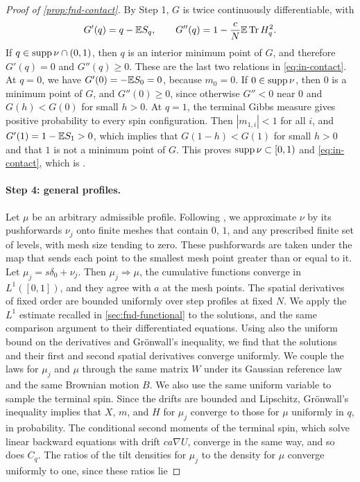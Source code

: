 \begin{proof}[Proof of \cref{prop:fnd-contact}]
By Step 1, $G$ is twice continuously differentiable, with
\[
 G'(q)=q-\mathbb E S_q,\qquad G''(q)=1-\frac cN\mathbb E\operatorname{Tr} H_q^2 .
\]
If $q\in\operatorname{supp}\nu\cap(0,1)$, then $q$ is an interior minimum point of
$G$, and therefore $G'(q)=0$ and $G''(q)\ge0$. These are the last two
relations in
\eqref{eq:in-contact}. At $q=0$, we have $G'(0)=-\mathbb E S_0=0$, because
$m_0=0$. If $0\in\operatorname{supp}\nu$, then $0$ is a minimum point of $G$, and
$G''(0)\ge0$, since otherwise $G''<0$ near $0$ and $G(h)<G(0)$ for
small $h>0$. At $q=1$, the terminal Gibbs measure gives positive
probability to every spin configuration. Then $|m_{1,i}|<1$ for all $i$,
and $G'(1)=1-\mathbb E S_1>0$, which implies that $G(1-h)<G(1)$ for small $h>0$
and that $1$ is not a minimum point of $G$. This proves
$\operatorname{supp}\nu\subset[0,1)$ and \eqref{eq:in-contact}, which is
\cite[(2.9)]{AL}.

\paragraph{Step 4: general profiles.}
Let $\mu$ be an arbitrary admissible profile. Following
\cite[Section~2.6]{AL}, we approximate $\nu$ by its pushforwards $\nu_j$
onto finite meshes that contain $0$, $1$, and any prescribed finite set
of levels, with mesh size tending to zero. These pushforwards are taken under the map that sends each point to
the smallest mesh point greater than or equal to it. Let
$\mu_j=s\delta_0+\nu_j$. Then $\mu_j\Rightarrow\mu$, the cumulative
functions converge in $L^1([0,1])$, and they agree with $a$ at the mesh
points. The spatial derivatives of fixed order are bounded uniformly
over step profiles at fixed $N$. We apply the $L^1$ estimate recalled in
\cref{sec:fnd-functional} to the solutions, and the same comparison
argument to their differentiated equations. Using also the uniform bound on the derivatives and
Gr\"onwall's inequality, we find that the solutions and their first and
second spatial derivatives converge uniformly. We couple the laws for $\mu_j$ and $\mu$
through the same matrix $W$ under its Gaussian reference law and the
same Brownian motion $B$. We also use the same uniform variable to
sample the terminal spin. Since the drifts are bounded and Lipschitz, Gr\"onwall's inequality
implies that $X$, $m$, and $H$ for $\mu_j$ converge to those for $\mu$
uniformly in $q$, in probability. The conditional second moments of the
terminal spin, which solve linear backward equations with drift
$ca\nabla U$, converge in the same way, and so does $C_q$. The ratios of the tilt densities for $\mu_j$ to
the density for $\mu$ converge uniformly to one, since these ratios lie

\end{proof}
